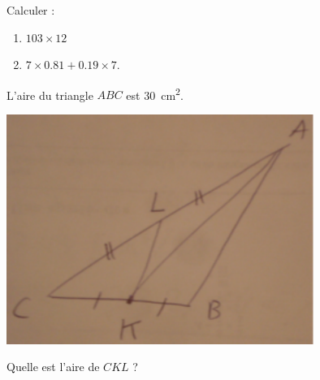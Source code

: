 \begin{MentalActivity}


    \begin{mental}
        Calculer :
        \begin{enumerate}
            \item
                \( 103\times 12\)
            \item
                \( 7\times 0.81+0.19\times 7\).
        \end{enumerate}
    \end{mental}
    \begin{mental}
        L'aire du triangle \( ABC\) est \SI{30}{\centi\meter\squared}.

        \includegraphics[width=10cm]{DSC01734.pdf}

        Quelle est l'aire de \( CKL\) ?
    \end{mental}
\end{MentalActivity}

